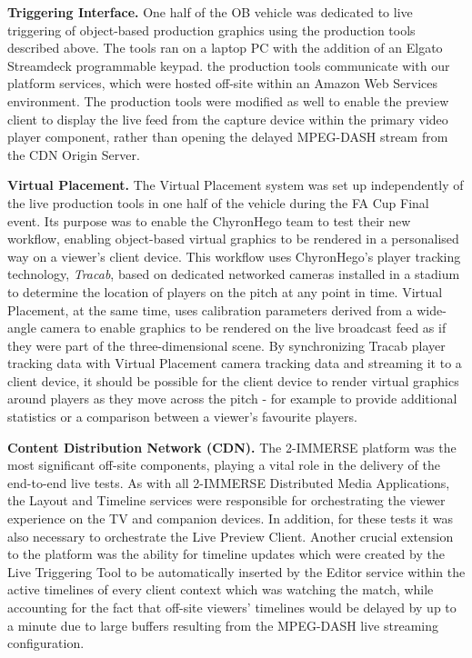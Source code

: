 \documentclass[sigchi-a, authorversion]{acmart}
\begin{document}
\vspace{5pt}\noindent\textbf{Triggering Interface.} One half of the OB vehicle was dedicated to live
triggering of object-based production graphics using the production tools
described above. The tools ran on a laptop PC with the addition of an Elgato
Streamdeck programmable keypad. the production tools communicate with our
platform services, which were hosted off-site within an Amazon Web Services
environment. The production tools were modified as well to enable the preview
client to display the live feed from the capture device within the primary video
player component, rather than opening the delayed MPEG-DASH stream from the CDN
Origin Server.

\vspace{5pt}\noindent\textbf{Virtual Placement.} The Virtual Placement system was set up independently
of the live production tools in one half of the vehicle during the FA Cup Final
event. Its purpose was to enable the ChyronHego team to test their new workflow,
enabling object-based virtual graphics to be rendered in a personalised way on
a viewer's client device. This workflow uses ChyronHego's player tracking
technology, \emph{Tracab}, based on dedicated networked cameras installed in a stadium
to determine the location of players on the pitch at any point in time. Virtual
Placement, at the same time, uses calibration parameters derived from a wide-angle
camera to enable graphics to be rendered on the live broadcast feed as if they
were part of the three-dimensional scene. By synchronizing Tracab player tracking
data with Virtual Placement camera tracking data and streaming it to a client
device, it should be possible for the client device to render virtual graphics
around players as they move across the pitch - for example to provide additional
statistics or a comparison between a viewer's favourite players.

\vspace{5pt}\noindent\textbf{Content Distribution Network (CDN).} The 2-IMMERSE platform \cite{jansen2018, kegel2017} was the most significant
off-site components, playing a vital role in the delivery of the end-to-end live
tests. As with all 2-IMMERSE Distributed Media Applications, the Layout and
Timeline services were responsible for orchestrating the viewer experience on
the TV and companion devices. In addition, for these tests it was also necessary
to orchestrate the Live Preview Client. Another crucial extension to the platform
was the ability for timeline updates which were created by the Live Triggering
Tool to be automatically inserted by the Editor service within the active
timelines of every client context which was watching the match, while accounting
for the fact that off-site viewers' timelines would be delayed by up to a minute
due to large buffers resulting from the MPEG-DASH live streaming configuration.
\end{document}

